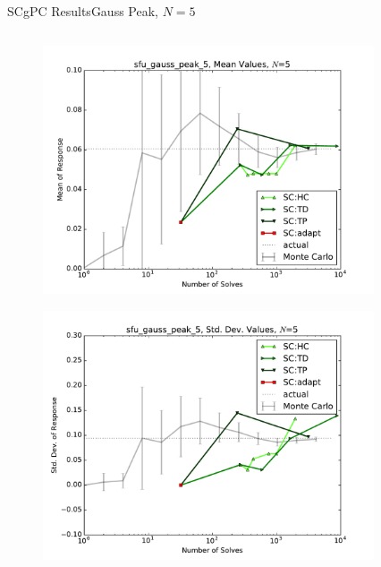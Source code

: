 \documentclass{beamer}
\begin{document}
\begin{frame}{SCgPC Results}{Gauss Peak, $N=5$}\vspace{-20pt}
 \begin{columns}
   \begin{column}{0.5\textwidth}
        \begin{figure}[h!]
          \centering
          \includegraphics[width=0.8\linewidth]{anlmodels/sfu_gauss_peak_5_mean_vals_nohdmr}
        \end{figure}
        \vspace{-20pt}
        \begin{figure}[h!]
          \centering
          \includegraphics[width=0.8\linewidth]{anlmodels/sfu_gauss_peak_5_var_vals_nohdmr}
        \end{figure}
   \end{column}
   \begin{column}{0.5\textwidth}
        \begin{figure}[h!]
          \centering

\end{figure}
\end{column}
\end{columns}
\end{frame}
\end{document}
